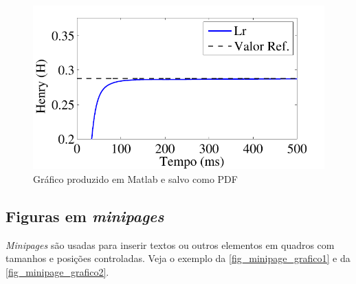 \begin{figure}[htb]
	\caption{\label{fig_grafico}Gráfico produzido em Matlab e salvo como PDF}
	\begin{center}
	    \includegraphics[scale=0.8]{./Figuras/abntex2-modelo-img-grafico.pdf}
	\end{center}
\end{figure}

\subsection{Figuras em \emph{minipages}}

\emph{Minipages} são usadas para inserir textos ou outros elementos em quadros
com tamanhos e posições controladas. Veja o exemplo da
\autoref{fig_minipage_grafico1} e da \autoref{fig_minipage_grafico2}.

